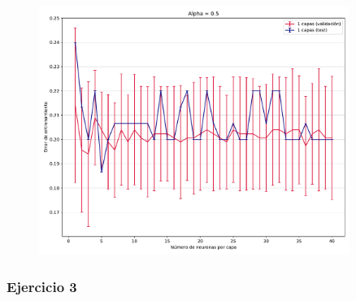 \documentclass[11pt]{article}
\begin{document}
\begin{itemize}
\begin{figure}[H]
    \includegraphics[width=0.9\textwidth]{fotos/ej2_2.pdf}
    \end{figure}
\end{itemize}


\subsubsection*{Ejercicio 3}
\end{document}
